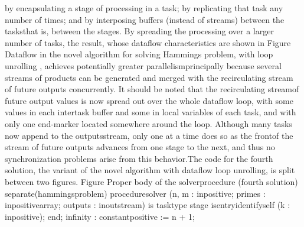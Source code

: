 by encapsulating a stage of processing in a task; by replicating that
task any number of times; and by interposing buffers (instead of streams)
between the tasks\EmDash[]that is, between the stages. By spreading
the processing over a larger number of tasks, the result, whose dataflow
characteristics are shown in Figure
Dataflow in the novel
algorithm for solving Hamming\rsquo[]s problem, with loop unrolling%
\FgEndcap[]
\PreProcFgGfx\FgGfx[\FgGfxHt=376.09pt \FgGfxWd=491.72pt \def\FgGfxPath{salishan.try12.book}\def\FgGfxCache{salishan.try12.book}\FgGfxX=0.00pt \FgGfxY=0.00pt \def\FgGfxProc{PubDraw}\FgGfxMag=80 \def\FgGfxFilename{unrolled-data-flow.vec}]
\FgEndblock[]
 , achieves potentially
greater parallelism\EmDash[]principally because several streams of
products can be generated and merged with the recirculating stream
of future outputs concurrently. It should be noted that the \ldquo[]recirculating
stream\rdquo[] of future output values is now spread out over the
whole dataflow loop, with some values in each intertask buffer and
some in local variables of each task, and with only one end-marker
located somewhere around the loop. Although many tasks now append
to the \tyxffmxmono[]outputs\tyxffmxendmono[] stream, only one at
a time does so as the \ldquo[]front\rdquo[] of the stream of future
outputs advances from one stage to the next, and thus no synchronization
problems arise from this behavior.\Endpara[]
\Para[]The code for the fourth solution, the variant of the novel
algorithm with dataflow loop unrolling, is split between two figures.
Figure 
\Parbox[]
Proper body of
the \tyxffmxmono[]solver\tyxffmxendmono[] procedure (fourth solution)%
\FgEndcap[]
\Comp[]\tyxtstxbf[]separate\tyxtstxendbf[] (hammings\Symuns[]problem)
\tyxtstxbf[]procedure\tyxtstxendbf[] solver (n, m    : %
\tyxtstxbf[]in\tyxtstxendbf[]     positive;
                  primes  : \tyxtstxbf[]in\tyxtstxendbf[]     positive\Symuns[]array;
                  outputs : \tyxtstxbf[]in\tyxtstxendbf[] %
\tyxtstxbf[]out\tyxtstxendbf[] stream) \tyxtstxbf[]is%
\tyxtstxendbf[]
   \tyxtstxbf[]task\tyxtstxendbf[] \tyxtstxbf[]type%
\tyxtstxendbf[] stage \tyxtstxbf[]is\tyxtstxendbf[]
      \tyxtstxbf[]entry\tyxtstxendbf[] identify\Symuns[]self (k : %
\tyxtstxbf[]in\tyxtstxendbf[] positive);
   \tyxtstxbf[]end\tyxtstxendbf[];
   infinity : \tyxtstxbf[]constant\tyxtstxendbf[] positive := n + 1;
